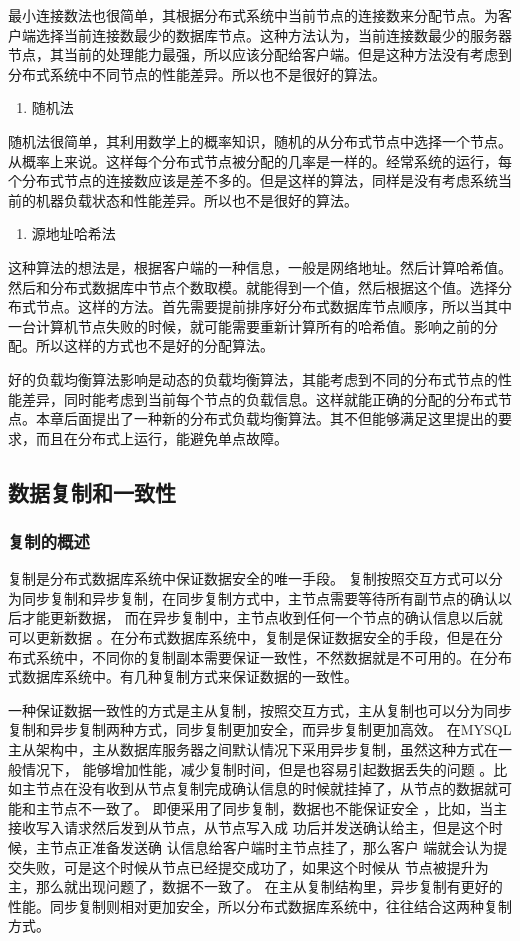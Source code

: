 	最小连接数法也很简单，其根据分布式系统中当前节点的连接数来分配节点。为客户端选择当前连接数最少的数据库节点。这种方法认为，当前连接数最少的服务器节点，其当前的处理能力最强，所以应该分配给客户端。但是这种方法没有考虑到分布式系统中不同节点的性能差异。所以也不是很好的算法。

\begin{enumerate}[resume]
	\item 随机法
\end{enumerate}

	随机法很简单，其利用数学上的概率知识，随机的从分布式节点中选择一个节点。从概率上来说。这样每个分布式节点被分配的几率是一样的。经常系统的运行，每个分布式节点的连接数应该是差不多的。但是这样的算法，同样是没有考虑系统当前的机器负载状态和性能差异。所以也不是很好的算法。
\begin{enumerate}[resume]
	\item 源地址哈希法
\end{enumerate}

	这种算法的想法是，根据客户端的一种信息，一般是网络地址。然后计算哈希值。然后和分布式数据库中节点个数取模。就能得到一个值，然后根据这个值。选择分布式节点。这样的方法。首先需要提前排序好分布式数据库节点顺序，所以当其中一台计算机节点失败的时候，就可能需要重新计算所有的哈希值。影响之前的分配。所以这样的方式也不是好的分配算法。
	
	好的负载均衡算法影响是动态的负载均衡算法，其能考虑到不同的分布式节点的性能差异，同时能考虑到当前每个节点的负载信息。这样就能正确的分配的分布式节点。本章后面提出了一种新的分布式负载均衡算法。其不但能够满足这里提出的要求，而且在分布式上运行，能避免单点故障。
\subsection{数据复制和一致性}
\subsubsection{复制的概述}
复制是分布式数据库系统中保证数据安全的唯一手段。
复制按照交互方式可以分为同步复制和异步复制，在同步复制方式中，主节点需要等待所有副节点的确认以后才能更新数据，
而在异步复制中，主节点收到任何一个节点的确认信息以后就可以更新数据
。在分布式数据库系统中，复制是保证数据安全的手段，但是在分布式系统中，不同你的复制副本需要保证一致性，不然数据就是不可用的。在分布式数据库系统中。有几种复制方式来保证数据的一致性。



一种保证数据一致性的方式是主从复制，按照交互方式，主从复制也可以分为同步复制和异步复制两种方式，同步复制更加安全，而异步复制更加高效。
在MYSQL主从架构中，主从数据库服务器之间默认情况下采用异步复制，虽然这种方式在一般情况下，
能够增加性能，减少复制时间，但是也容易引起数据丢失的问题
。比如主节点在没有收到从节点复制完成确认信息的时候就挂掉了，从节点的数据就可能和主节点不一致了。
即便采用了同步复制，数据也不能保证安全
，比如，当主接收写入请求然后发到从节点，从节点写入成
功后并发送确认给主，但是这个时候，主节点正准备发送确
认信息给客户端时主节点挂了，那么客户
端就会认为提交失败，可是这个时候从节点已经提交成功了，如果这个时候从
节点被提升为主，那么就出现问题了，数据不一致了。
在主从复制结构里，异步复制有更好的性能。同步复制则相对更加安全，所以分布式数据库系统中，往往结合这两种复制方式。

